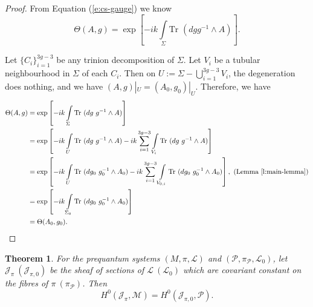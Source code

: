 \documentclass[]{article}
\newtheorem{theorem}{Theorem}
\newcommand{\JJ}{\mathcal{J}}
\newcommand{\LL}{\mathcal{L}}
\newcommand{\MM}{\mathcal{M}}
\newcommand{\cP}{\mathcal{P}}
\newcommand{\Tr}{\text{Tr }}
\begin{document}
	\begin{proof}
		From Equation (\ref{e:cs-gauge}) we know
		\begin{equation}
			\Theta(A,g) = \exp\left[-ik\int\limits_\Sigma \Tr(dg g^{-1}\wedge A)\right].
		\end{equation}
		
		Let $\{C_i\}_{i=1}^{3g-3}$ be any trinion decomposition of $\Sigma$. Let $V_i$ be a tubular neighbourhood in $\Sigma$ of each $C_i$. Then on $U:= \Sigma - \bigcup_{i=1}^{3g-3}V_i$, the degeneration does nothing, and we have $(A,g)|_U = (A_0,g_0)|_U$. Therefore, we have
		\begin{align*}
				\Theta(A,g) &= \exp\left[-ik\int\limits_\Sigma \Tr(dg~ g^{-1}\wedge A)\right]\\
				&= \exp\left[-ik\int\limits_U \Tr(dg~g^{-1}\wedge A)
				-ik \sum_{i=1}^{3g-3}\int\limits_{V_i} \Tr(dg~g^{-1}\wedge A)\right]\\
				&= \exp\left[-ik\int\limits_U \Tr(dg_0~g_0^{-1}\wedge A_0)
				-ik \sum_{i=1}^{3g-3}\int\limits_{V_{0,i}} \Tr(dg_0~g_0^{-1}\wedge A_0)\right],~ (\text{Lemma } \ref{l:main-lemma})\\
				&= \exp\left[-ik\int\limits_{\Sigma_0} \Tr(dg_0~ g_0^{-1}\wedge A_0)\right]\\
				&= \Theta(A_0,g_0).
		\end{align*}
	\end{proof}
	\begin{theorem}
		For the prequantum systems $(M,\pi,\LL)$ and $(\cP,\pi_{\cP}, \LL_0)$, let $\JJ_\pi ~(\JJ_{\pi,0})$ be the sheaf of sections of $\LL ~(\LL_0)$ which are covariant constant on the fibres of $\pi ~(\pi_\cP)$. Then
		\begin{equation}
			H^0(\JJ_\pi, \MM) = H^0(\JJ_{\pi,0}, \cP).
		\end{equation}
	\end{theorem}
\end{document}
